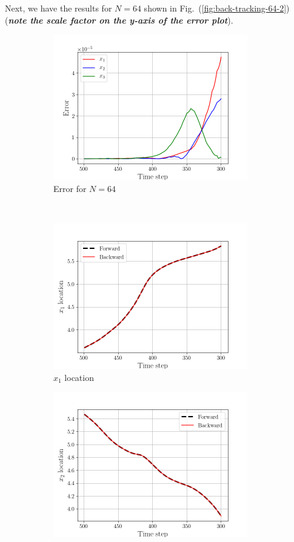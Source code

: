 Next, we have the results for $N=64$ shown in
Fig.~(\ref{fig:back-tracking-64-2}) (\emph{\textbf{note the scale factor on the
y-axis of the error plot}}).
\begin{figure}[H]
    \begin{subfigure}[H]{0.45\textwidth}
        \includegraphics[height=2.5in]{media/rk4/run-64/error-64-2.png}
        \caption{Error for $N=64$}
    \end{subfigure}
    ~
    \begin{subfigure}[H]{0.45\textwidth}
        \includegraphics[height=2.5in]{media/rk4/run-64/x1-64-tracking-2.png}
        \caption{$x_{1}$ location}
    \end{subfigure}
    \newline
    \begin{subfigure}[H]{0.45\textwidth}
        \includegraphics[height=2.5in]{media/rk4/run-64/x2-64-tracking-2.png}

\end{subfigure}
\end{figure}
